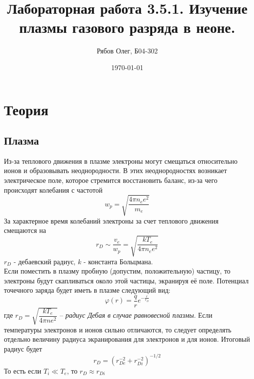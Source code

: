 \documentclass[a4paper, 12pt]{article}
\title{Лабораторная работа 3.5.1. Изучение плазмы газового разряда в неоне.}
\author{Рябов Олег, Б04-302}
\date{\today}
\begin{document}
	\maketitle
	\section*{Теория}
	\subsection*{Плазма}
	
	Из-за теплового движения в плазме электроны могут смещаться относительно ионов и образовывать неоднородности. В этих неоднородностях возникает электрическое поле, которое стремится восстановить баланс, из-за чего происходят колебания с частотой 
	\[w_p = \sqrt{\frac{4\pi n_e e^2}{m_e}}\]
	За характерное время колебаний электроны за счет теплового движения смещаются на 
	\[r_D \sim \frac{v_e}{w_p} = \sqrt{\frac{kT_e}{4\pi n_e e^2}}\]
	$r_D$ - дебаевский радиус, $k$ - константа Больцмана.\\
	Если поместить в плазму пробную (допустим, положительную) частицу, то электроны будут скапливаться около этой частицы, экранируя её поле. Потенциал точечного заряда будет иметь в плазме следующий вид:
	\[\varphi(r) = \frac{q}{r}e^{-\frac{r}{r_D}}\]
	где $r_D = \sqrt{\dfrac{kT_e}{4\pi n e^2}}$ -- \textit{радиус Дебая в случае равновесной плазмы}. Если температуры электронов и ионов сильно отличаются, то следует определять отдельно величину радиуса экранирования для электронов и для ионов. Итоговый радиус будет
	\[r_D = (r_{De}^{-2} + r_{Di}^{-2})^{-1/2}\]
	То есть если $T_i \ll T_e$, то $r_D \approx r_{Di}$ 
\end{document}
